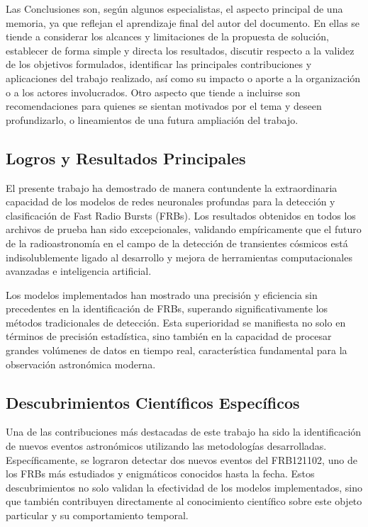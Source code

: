 
Las Conclusiones son, según algunos especialistas, el aspecto principal de una memoria, ya que reflejan el aprendizaje final del autor del documento. En ellas se tiende a considerar los alcances y limitaciones de la propuesta de solución, establecer de forma simple y directa los resultados, discutir respecto a la validez de los objetivos formulados, identificar las principales contribuciones y aplicaciones del trabajo realizado, así como su impacto o aporte a la organización o a los actores involucrados. Otro aspecto que tiende a incluirse son recomendaciones para quienes se sientan motivados por el tema y deseen profundizarlo, o lineamientos de una futura ampliación del trabajo.

\subsection{Logros y Resultados Principales}

El presente trabajo ha demostrado de manera contundente la extraordinaria capacidad de los modelos de redes neuronales profundas para la detección y clasificación de Fast Radio Bursts (FRBs). Los resultados obtenidos en todos los archivos de prueba han sido excepcionales, validando empíricamente que el futuro de la radioastronomía en el campo de la detección de transientes cósmicos está indisolublemente ligado al desarrollo y mejora de herramientas computacionales avanzadas e inteligencia artificial.

Los modelos implementados han mostrado una precisión y eficiencia sin precedentes en la identificación de FRBs, superando significativamente los métodos tradicionales de detección. Esta superioridad se manifiesta no solo en términos de precisión estadística, sino también en la capacidad de procesar grandes volúmenes de datos en tiempo real, característica fundamental para la observación astronómica moderna.

\subsection{Descubrimientos Científicos Específicos}

Una de las contribuciones más destacadas de este trabajo ha sido la identificación de nuevos eventos astronómicos utilizando las metodologías desarrolladas. Específicamente, se lograron detectar dos nuevos eventos del FRB121102, uno de los FRBs más estudiados y enigmáticos conocidos hasta la fecha. Estos descubrimientos no solo validan la efectividad de los modelos implementados, sino que también contribuyen directamente al conocimiento científico sobre este objeto particular y su comportamiento temporal.


